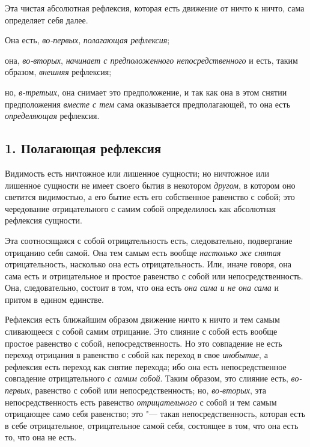Эта чистая абсолютная рефлексия, которая есть движение от ничто к ничто,
сама определяет себя далее.

Она есть, {\em во-первых},
{\em полагающая рефлексия};

она, {\em во-вторых}, {\em начинает
с предположенного непосредственного} и есть, таким образом,
{\em внешняя} рефлексия;

но, {\em в-третьих}, она снимает это предположение, и
так как она в этом снятии предположения {\em вместе с
тем} сама оказывается предполагающей, то она есть
{\em определяющая} рефлексия.

\subsection[1. Полагающая рефлексия]{1. Полагающая рефлексия}
Видимость есть ничтожное или лишенное сущности;
но ничтожное или лишенное сущности не имеет своего бытия в некотором
{\em другом}, в котором оно светится видимостью, а его
бытие есть его собственное равенство с собой; это чередование
отрицательного с самим собой определилось как абсолютная рефлексия
сущности.

Эта соотносящаяся с собой отрицательность есть, следовательно, подвергание
отрицанию себя самой. Она тем самым есть вообще
{\em настолько же снятая} отрицательность, насколько
она есть отрицательность. Или, иначе говоря, она сама есть и отрицательное
и простое равенство с собой или непосредственность. Она, следовательно,
состоит в том, что она есть {\em она сама и не она
сама} и притом в едином единстве.

Рефлексия есть ближайшим образом движение ничто к ничто и тем самым
сливающееся с собой самим отрицание. Это слияние с собой есть вообще
простое равенство с собой, непосредственность. Но это совпадение не есть
переход отрицания в равенство с собой как переход в свое
{\em инобытие}, а рефлексия есть переход как снятие
перехода; ибо она есть непосредственное совпадение отрицательного
{\em с самим собой}. Таким образом, это слияние есть,
{\em во-первых}, равенство с собой или
непосредственность; но, {\em во-вторых}, эта
непосредственность есть равенство {\em отрицательного}
с собой и тем самым отрицающее само себя равенство; это "--- такая
непосредственность, которая есть в себе отрицательное, отрицательное самой
себя, состоящее в том, что она есть то, что она не есть.

